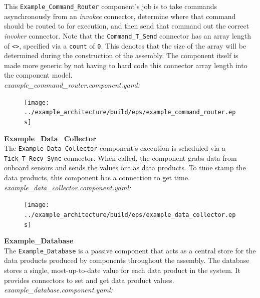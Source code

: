 This \texttt{Example\_Command\_Router} component's job is to take commands asynchronously from an \textit{invokee} connector, determine where that command should be routed to for execution, and then send that command out the correct \textit{invoker} connector. Note that the \texttt{Command\_T\_Send} connector has an array length of \texttt{<>}, specified via a \texttt{count} of \texttt{0}. This denotes that the size of the array will be determined during the construction of the assembly. The component itself is made more generic by not having to hard code this connector array length into the component model. \\

\textit{example\_command\_router.component.yaml:}

\begin{figure}[H]
  \texttt{[image: ../example\_architecture/build/eps/example\_command\_router.eps]}
\end{figure}

\textbf{Example\_Data\_Collector} \\

The \texttt{Example\_Data\_Collector} component's execution is scheduled via a \texttt{Tick\_T\_Recv\_Sync} connector. When called, the component grabs data from onboard sensors and sends the values out as data products. To time stamp the data products, this component has a connection to get time. \\

\textit{example\_data\_collector.component.yaml:}

\begin{figure}[H]
  \texttt{[image: ../example\_architecture/build/eps/example\_data\_collector.eps]}
\end{figure}

\textbf{Example\_Database} \\

The \texttt{Example\_Database} is a passive component that acts as a central store for the data products produced by components throughout the assembly. The database stores a single, most-up-to-date value for each data product in the system. It provides connectors to set and get data product values. \\

\textit{example\_database.component.yaml:}

